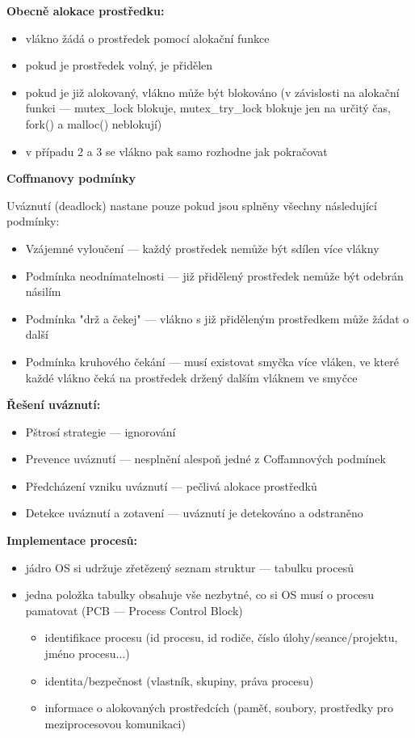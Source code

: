 \textbf{Obecně alokace prostředku:}
\begin{itemize}
	\item vlákno žádá o prostředek pomocí alokační funkce
	\item pokud je prostředek volný, je přidělen
	\item pokud je již alokovaný, vlákno může být blokováno (v závislosti na alokační funkci --- mutex\_lock blokuje, mutex\_try\_lock blokuje jen na určitý čas, fork() a malloc() neblokují)
	\item v případu 2 a 3 se vlákno pak samo rozhodne jak pokračovat
\end{itemize}

\textbf{Coffmanovy podmínky}

Uváznutí (deadlock) nastane pouze pokud jsou splněny všechny následující podmínky:
\begin{itemize}
	\item Vzájemné vyloučení --- každý prostředek nemůže být sdílen více vlákny
	\item Podmínka neodnímatelnosti --- již přidělený prostředek nemůže být odebrán násilím
	\item Podmínka "drž a čekej" --- vlákno s již přiděleným prostředkem může žádat o další
	\item Podmínka kruhového čekání --- musí existovat smyčka více vláken, ve které každé vlákno čeká na prostředek držený dalším vláknem ve smyčce
\end{itemize}

\textbf{Řešení uváznutí:}
\begin{itemize}
	\item Pštrosí strategie --- ignorování
	\item Prevence uváznutí --- nesplnění alespoň jedné z Coffamnových podmínek
	\item Předcházení vzniku uváznutí --- pečlivá alokace prostředků
	\item Detekce uváznutí a zotavení --- uváznutí je detekováno a odstraněno
\end{itemize}

\textbf{Implementace procesů:}
\begin{itemize}
	\item jádro OS si udržuje zřetězený seznam struktur --- tabulku procesů
	\item jedna položka tabulky obsahuje vše nezbytné, co si OS musí o procesu pamatovat (PCB --- Process Control Block)
	\begin{itemize}
		\item identifikace procesu (id procesu, id rodiče, číslo úlohy/seance/projektu, jméno procesu...)
		\item identita/bezpečnost (vlastník, skupiny, práva procesu)
		\item informace o alokovaných prostředcích (paměť, soubory, prostředky pro meziprocesovou komunikaci)
	\end{itemize}
\end{itemize}

